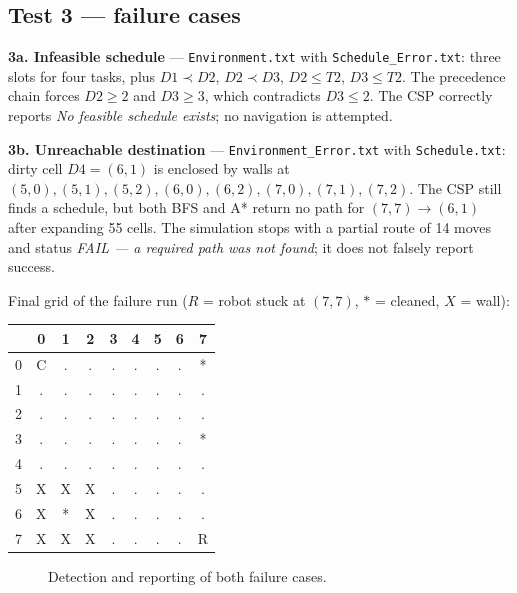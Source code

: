 \documentclass[11pt,a4paper]{article}
\newcommand{\code}[1]{\texttt{#1}}
\begin{document}
\subsection{Test 3 --- failure cases}

\noindent\textbf{3a. Infeasible schedule} --- \code{Environment.txt} with
\code{Schedule\_Error.txt}: three slots for four tasks, plus $D1\!\prec\!D2$, $D2\!\prec\!D3$,
$D2\le T2$, $D3\le T2$. The precedence chain forces $D2\ge 2$ and $D3\ge 3$, which contradicts
$D3\le 2$. The CSP correctly reports \emph{No feasible schedule exists}; no navigation is
attempted.

\noindent\textbf{3b. Unreachable destination} --- \code{Environment\_Error.txt} with
\code{Schedule.txt}: dirty cell $D4=(6,1)$ is enclosed by walls at
$(5,0),(5,1),(5,2),(6,0),(6,2),(7,0),(7,1),(7,2)$. The CSP still finds a schedule, but both
BFS and A* return no path for $(7,7)\to(6,1)$ after expanding 55 cells. The simulation stops
with a partial route of 14 moves and status \emph{FAIL --- a required path was not found};
it does not falsely report success.

Final grid of the failure run ($R$ = robot stuck at $(7,7)$, $*$ = cleaned, $X$ = wall):
\begin{center}
\small
\begin{tabular}{c|cccccccc}
      & 0 & 1 & 2 & 3 & 4 & 5 & 6 & 7 \\ \hline
0 & C & . & . & . & . & . & . & * \\
1 & . & . & . & . & . & . & . & . \\
2 & . & . & . & . & . & . & . & . \\
3 & . & . & . & . & . & . & . & * \\
4 & . & . & . & . & . & . & . & . \\
5 & X & X & X & . & . & . & . & . \\
6 & X & * & X & . & . & . & . & . \\
7 & X & X & X & . & . & . & . & R \\
\end{tabular}
\end{center}

\begin{figure}[H]
\centering
{}
\caption{Detection and reporting of both failure cases.}
\end{figure}
\end{document}
